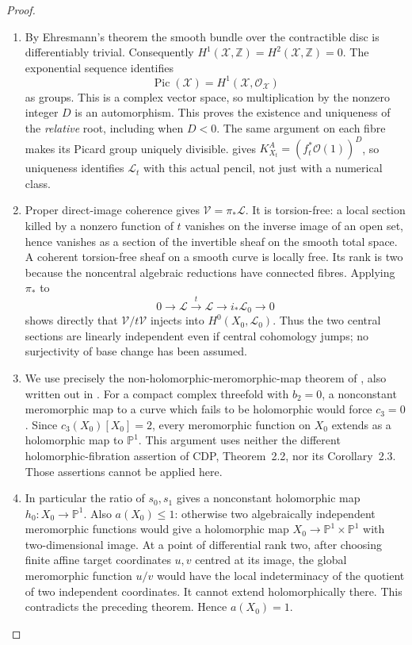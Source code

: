 \begin{proof}

\begin{enumerate}[label={$\langle1\rangle$\arabic*.},leftmargin=*]
\item By Ehresmann's theorem the smooth bundle over the contractible
disc is differentiably trivial.  Consequently
$H^1(\mathcal X,\mathbb Z)=H^2(\mathcal X,\mathbb Z)=0$.
The exponential sequence identifies
\[
 \operatorname{Pic}(\mathcal X)=H^1(\mathcal X,\mathcal O_{\mathcal X})
\]
as groups.  This is a complex vector space, so multiplication by
the nonzero integer $D$ is an automorphism.  This proves the
existence and uniqueness of the \emph{relative} root, including
when $D<0$.  The same argument on each fibre makes its Picard
group uniquely divisible.   gives
$K_{X_t}^{A}=(f_t^*\mathcal O(1))^{D}$, so uniqueness identifies
$\mathcal L_t$ with this actual pencil, not just with a numerical
class.

\item Proper direct-image coherence gives $\mathcal V=\pi_*\mathcal L$.
It is torsion-free: a local section killed by a nonzero function
of $t$ vanishes on the inverse image of an open set, hence
vanishes as a section of the invertible sheaf on the smooth
total space.  A coherent torsion-free sheaf on a smooth curve
is locally free.  Its rank is two because the noncentral
algebraic reductions have connected fibres.  Applying $\pi_*$
to
\[
 0\longrightarrow\mathcal L\xrightarrow{\,t\,}\mathcal L
 \longrightarrow i_*\mathcal L_0\longrightarrow0
\]
shows directly that $\mathcal V/t\mathcal V$ injects into
$H^0(X_0,\mathcal L_0)$.  Thus the two central sections are
linearly independent even if central cohomology jumps; no
surjectivity of base change has been assumed.

\item We use precisely the non-holomorphic-meromorphic-map theorem
of \citet[Theorem~2.1]{CDP2020D}, also written out in
\citet[Theorem~3.1 and Corollary~3.2]{LRS2019}.
For a compact complex threefold with $b_2=0$, a nonconstant
meromorphic map to a curve which fails to be holomorphic
would force $c_3=0$.  Since $c_3(X_0)[X_0]=2$, every
meromorphic function on $X_0$ extends as a holomorphic map
to $\mathbb P^1$.  This argument uses neither the different
holomorphic-fibration assertion of CDP, Theorem~2.2, nor its
Corollary~2.3.  Those assertions cannot be applied here.

\item In particular the ratio of $s_0,s_1$ gives a nonconstant
holomorphic map $h_0:X_0\to\mathbb P^1$.  Also $a(X_0)\le1$:
otherwise two algebraically independent meromorphic functions
would give a holomorphic map $X_0\to\mathbb P^1\times\mathbb P^1$
with two-dimensional image.  At a point of differential rank
two, after choosing finite affine target coordinates $u,v$
centred at its image, the global meromorphic function $u/v$
would have the local indeterminacy of the quotient of two
independent coordinates.  It cannot extend holomorphically
there.  This contradicts the preceding theorem.  Hence
$a(X_0)=1$.


\end{enumerate}
\end{proof}
